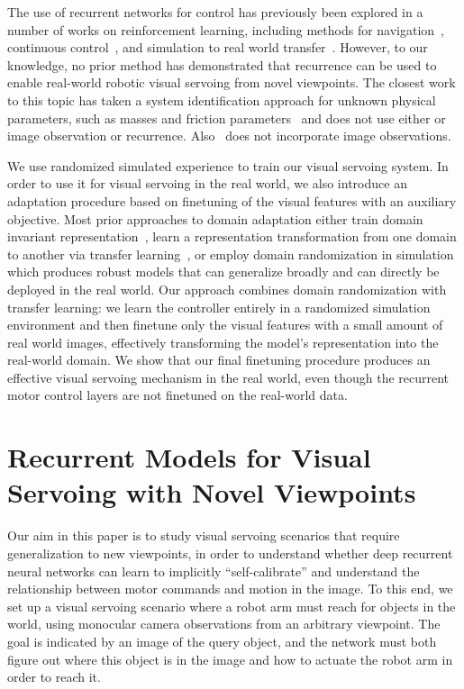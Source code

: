 \documentclass[10pt,twocolumn,letterpaper]{article}
\begin{document}
The use of recurrent networks for control has previously been explored in a number of works on reinforcement learning, including methods for navigation~\cite{mnih2016asynchronous,oh2016control},
continuous control~\cite{heess2015memory,zhang2016learning}, and simulation to real world transfer~\cite{peng2017sim}. However, to our knowledge, no prior method has demonstrated that recurrence can be used to enable real-world robotic visual servoing from novel viewpoints. The closest work to this topic has taken a system identification approach for unknown physical parameters, such as masses and friction parameters~\cite{yu2017preparing} and does not use either or image observation or recurrence. Also~\cite{peng2017sim} does not incorporate image observations.


We use randomized simulated experience to train our visual servoing system. In order to use it for visual servoing in the real world, we also introduce an adaptation procedure based on finetuning of the visual features with an auxiliary objective. Most prior approaches to domain adaptation either train domain invariant representation~\cite{long2015learning, bousmalis2016domain, ganin2016domain,bousmalis2017using}, learn a representation transformation from one domain to another via transfer learning~\cite{gopalan2011domain,tzeng2015adapting,rusu2016sim}, or employ domain randomization in simulation~\cite{sadeghi2017cadrl,tobin2017domain} which produces robust models that can generalize broadly and can directly be deployed in the real world. Our approach combines domain randomization with transfer learning: we learn the controller entirely in a randomized simulation environment and then finetune only the visual features with a small amount of real world images, effectively transforming the model's representation into the real-world domain. We show that our final finetuning procedure produces an effective visual servoing mechanism in the real world, even though the recurrent motor control layers are not finetuned on the real-world data.


\section{Recurrent Models for Visual Servoing with Novel Viewpoints}
\label{sec:rcm}

Our aim in this paper is to study visual servoing scenarios that require generalization to new viewpoints, in order to understand whether deep recurrent neural networks can learn to implicitly ``self-calibrate'' and understand the relationship between motor commands and motion in the image. To this end, we set up a visual servoing scenario where a robot arm must reach for objects in the world, using monocular camera observations from an arbitrary viewpoint. The goal is indicated by an image of the query object, and the network must both figure out where this object is in the image and how to actuate the robot arm in order to reach it.
\end{document}
